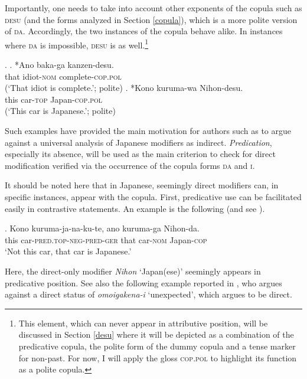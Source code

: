 Importantly, one needs to take into account other exponents of the copula such as \textsc{desu} (and the forms analyzed in Section \ref{copula}), which is a more polite version of \textsc{da}. Accordingly, the two instances of the copula behave alike. In instances where \textsc{da} is impossible, \textsc{desu} is as well.\footnote{This element, which can never appear in attributive position, will be discussed in Section \ref{desu} where it will be depicted as a combination of the predicative copula, the polite form of the dummy copula and a tense marker for non-past. For now, I will apply the gloss \textsc{cop.pol} to highlight its function as a polite copula.}

\ex. \ag. *Ano baka-ga kanzen-desu.\\
that idiot-\textsc{nom} complete-\textsc{cop.pol}\\
(`That idiot is complete.’; polite)
\bg. *Kono kuruma-wa Nihon-desu.\\
this car-\textsc{top} Japan-\textsc{cop.pol}\\
(`This car is Japanese.’; polite)

Such examples have provided the main motivation for authors such as \citet{yamakido:2005:nature} to argue against a universal analysis of Japanese modifiers as indirect. \textit{Predication}, especially its absence, will be used as the main criterion to check for direct modification verified via the occurrence of the copula forms \textsc{da} and \textsc{i}.

It should be noted here that in Japanese, seemingly direct modifiers can, in specific instances, appear with the copula. First, predicative use can be facilitated easily in contrastive statements. An example is the following (and see \citealt{hoshi:2002:kaynean, shimada:2018:relational}).

\exg. Kono kuruma-ja-na-ku-te, ano kuruma-ga Nihon-da.\\
this car-\textsc{pred.top-neg-pred-ger} that car-\textsc{nom} Japan-\textsc{cop}\\
`Not this car, that car is Japanese.’ \label{kurumajanakute}

Here, the direct-only modifier \textit{Nihon} `Japan(ese)’ seemingly appears in predicative position. See also the following example reported in \citet{hoshi:2002:kaynean}, who argues against a direct status of \textit{omoigakena-i} `unexpected’, which \citet{yamakido:2005:nature} argues to be direct.

